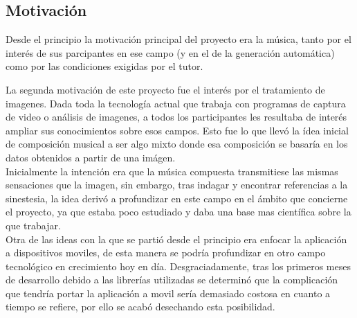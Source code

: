 \subsection{Motivación}



Desde el principio la motivación principal del proyecto era la música, tanto por el interés de sus parcipantes en ese campo (y en el de la generación automática) como por las condiciones exigidas por el tutor.

La segunda motivación de este proyecto fue el interés por el tratamiento de imagenes. Dada toda la tecnología actual que trabaja con programas de captura de video o análisis de imagenes, a todos los participantes les resultaba de interés ampliar sus conocimientos sobre esos campos. Esto fue lo que llevó la ídea inicial de composición musical a ser algo mixto donde esa composición se basaría en los datos obtenidos a partir de una imágen.
\\Inicialmente la intención era que la música compuesta transmitiese las mismas sensaciones que la imagen, sin embargo, tras indagar y encontrar referencias a la sinestesia, la idea derivó a profundizar en este campo en el ámbito que concierne el proyecto, ya que estaba poco estudiado y daba una base mas científica sobre la que trabajar.\\

Otra de las ideas con la que se partió desde el principio era enfocar la aplicación a dispositivos moviles, de esta manera se podría profundizar en otro campo tecnológico en crecimiento hoy en día. Desgraciadamente, tras los primeros meses de desarrollo debido a las librerías utilizadas
se determinó que la complicación que tendría portar la aplicación a movil sería demasiado costosa en cuanto a tiempo se refiere, por ello se acabó desechando esta posibilidad.\\



